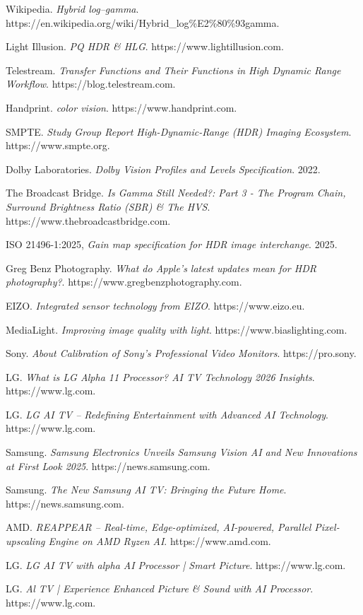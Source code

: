 \documentclass[12pt, a4paper]{ctexart}
\begin{document}
{\begin{enumerate}[label={[\arabic*]}]
    \item Wikipedia. \textit{Hybrid log–gamma}. https://en.wikipedia.org/wiki/Hybrid\_log\%E2\%80\%93gamma.
    \item Light Illusion. \textit{PQ HDR \& HLG}. https://www.lightillusion.com.
    \item Telestream. \textit{Transfer Functions and Their Functions in High Dynamic Range Workflow}. https://blog.telestream.com.
    \item Handprint. \textit{color vision}. https://www.handprint.com.
    \item SMPTE. \textit{Study Group Report High-Dynamic-Range (HDR) Imaging Ecosystem}. https://www.smpte.org.
    \item Dolby Laboratories. \textit{Dolby Vision Profiles and Levels Specification}. 2022.
    \item The Broadcast Bridge. \textit{Is Gamma Still Needed?: Part 3 - The Program Chain, Surround Brightness Ratio (SBR) \& The HVS}. https://www.thebroadcastbridge.com.
    \item ISO 21496-1:2025, \textit{Gain map specification for HDR image interchange}. 2025.
    \item Greg Benz Photography. \textit{What do Apple's latest updates mean for HDR photography?}. https://www.gregbenzphotography.com.
    \item EIZO. \textit{Integrated sensor technology from EIZO}. https://www.eizo.eu.
    \item MediaLight. \textit{Improving image quality with light}. https://www.biaslighting.com.
    \item Sony. \textit{About Calibration of Sony's Professional Video Monitors}. https://pro.sony.
    \item LG. \textit{What is LG Alpha 11 Processor? AI TV Technology 2026 Insights}. https://www.lg.com.
    \item LG. \textit{LG AI TV – Redefining Entertainment with Advanced AI Technology}. https://www.lg.com.
    \item Samsung. \textit{Samsung Electronics Unveils Samsung Vision AI and New Innovations at First Look 2025}. https://news.samsung.com.
    \item Samsung. \textit{The New Samsung AI TV: Bringing the Future Home}. https://news.samsung.com.
    \item AMD. \textit{REAPPEAR – Real-time, Edge-optimized, AI-powered, Parallel Pixel-upscaling Engine on AMD Ryzen AI}. https://www.amd.com.
    \item LG. \textit{LG AI TV with alpha AI Processor | Smart Picture}. https://www.lg.com.
    \item LG. \textit{Al TV | Experience Enhanced Picture \& Sound with AI Processor}. https://www.lg.com.
\end{enumerate}
}
\end{document}
